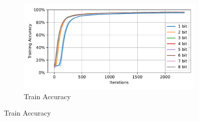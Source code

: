    \label{appendix:accuracy_curves_nmnist}
        \begin{figure}[H]
            \centering
            \begin{subfigure}[H]{\textwidth}
                \centering
                \includegraphics[width=\textwidth]{../standard/NMNIST/plots/nmnist_train_acc.pdf}
                \caption{Train Accuracy}
            \end{subfigure}
        \end{figure}
